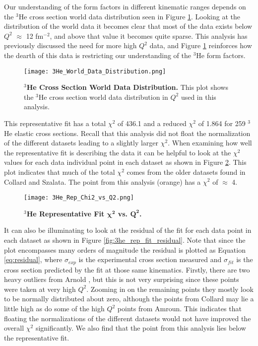 Our understanding of the form factors in different kinematic ranges depends on the $^3$He cross section world data distribution seen in Figure \ref{fig:3he_data_distribution}. Looking at the distribution of the world data it becomes clear that most of the data exists below $Q^2$ $\approx$ 12 fm$^{-2}$, and above that value it becomes quite sparse. This analysis has previously discussed the need for more high $Q^2$ data, and Figure \ref{fig:3he_data_distribution} reinforces how the dearth of this data is restricting our understanding of the $^3$He form factors.

\begin{figure}[!ht]
	\begin{center}
	\texttt{[image: 3He\_World\_Data\_Distribution.png]}
	\end{center}
	\caption[$^3$He Cross Section World Data Distribution]{
	{\bf{$^3$He Cross Section World Data Distribution.}} This plot shows the $^3$He cross section world data distribution in $Q^2$ used in this analysis.}
	\label{fig:3he_data_distribution}
\end{figure}

This representative fit has a total $\chi^2$ of 436.1 and a reduced $\chi^2$ of 1.864 for 259 $^3$He elastic cross sections. Recall that this analysis did not float the normalization of the different datasets leading to a slightly larger $\chi^2$. When examining how well the representative fit is describing the data it can be helpful to look at the $\chi^2$ values for each data individual point in each dataset as shown in Figure \ref{fig:3he_rep_fit_chi2_q2}. This plot indicates that much of the total $\chi^2$ comes from the older datasets found in Collard and Szalata. The point from this analysis (orange) has a $\chi^2$ of $\approx$ 4. 

\begin{figure}[!ht]
	\begin{center}
	\texttt{[image: 3He\_Rep\_Chi2\_vs\_Q2.png]}
	\end{center}
	\caption[$^3$He Representative Fit $\chi^2$ vs. $Q^2$]{
	{\bf{$^3$He Representative Fit $\boldsymbol{\chi^2}$ vs. $\boldsymbol{Q^2}$.}} }
	\label{fig:3he_rep_fit_chi2_q2}
\end{figure}

It can also be illuminating to look at the residual of the fit for each data point in each dataset as shown in Figure \ref{fig:3he_rep_fit_residual}. Note that since the plot encompasses many orders of magnitude the residual is plotted as Equation \ref{eq:residual}, where $\sigma_{exp}$ is the experimental cross section measured and $\sigma_{fit}$ is the cross section predicted by the fit at those same kinematics. Firstly, there are two heavy outliers from Arnold \cite{Article:Arnold}, but this is not very surprising since these points were taken at very high $Q^2$. Zooming in on the remaining points they mostly look to be normally distributed about zero, although the points from Collard may lie a little high as do some of the high $Q^2$ points from Amroun. This indicates that floating the normalizations of the different datasets would not have improved the overall $\chi^2$ significantly. We also find that the point from this analysis lies below the representative fit.

